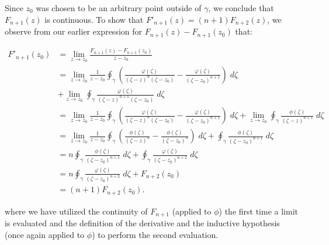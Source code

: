 \begin{solution}
    Since $z_0$ was chosen to be an arbitrary point outside of $\gamma$, we conclude that $F_{n+1}(z)$ is continuous. To
    show that $F'_{n+1}(z) = (n + 1) F_{n+2}(z)$, we observe from our earlier expression for $F_{n+1}(z) - F_{n+1}(z_0)$ 
    that:

    \begin{align*}
        F'_{n+1}(z_0) &= \lim_{z \to z_0} \frac{F_{n+1}(z) - F_{n+1}(z_0)}{z - z_0} \\
                    &= \lim_{z \to z_0} \frac{1}{z - z_0}\oint_{\gamma} {\left(\frac{\varphi(\zeta)}{(\zeta - z)^{n}(\zeta - z_0)} - \frac{\varphi(\zeta)}{(\zeta - z_0)^{n+1}} \right) \; d\zeta} \\
                    &+ \lim_{z \to z_0} \oint_{\gamma} {\frac{\varphi(\zeta)}{(\zeta - z)^{n+1}(\zeta - z_0)} \; d\zeta} \\
                    &= \lim_{z \to z_0} \frac{1}{z - z_0}\oint_{\gamma} {\left(\frac{\varphi(\zeta)}{(\zeta - z)^{n}(\zeta - z_0)} - \frac{\varphi(\zeta)}{(\zeta - z_0)^{n+1}} \right) \; d\zeta}
                    + \lim_{z \to z_0} \oint_{\gamma} {\frac{\phi(\zeta)}{(\zeta - z)^{n+1}} \; d\zeta} \\
                    &= \lim_{z \to z_0} \frac{1}{z - z_0}\oint_{\gamma} {\left(\frac{\phi(\zeta)}{(\zeta - z)^{n}} - \frac{\phi(\zeta)}{(\zeta - z_0)^n} \right) \; d\zeta}
                    + \oint_{\gamma} {\frac{\phi(\zeta)}{(\zeta - z_0)^{n+1}} \; d\zeta} \\
                    &= n \oint_{\gamma} {\frac{\phi(\zeta)}{(\zeta - z_0)^{n+1}} \; d\zeta}
                    + \oint_{\gamma} {\frac{\varphi(\zeta)}{(\zeta - z_0)^{n+2}} \; d\zeta} \\
                    &= n \oint_{\gamma} {\frac{\varphi(\zeta)}{(\zeta - z_0)^{n+2}} \; d\zeta} + F_{n+2}(z_0) \\
                    &= (n + 1) F_{n+2}(z_0).
    \end{align*}

    where we have utilized the continuity of $F_{n+1}$ (applied to $\phi$) the first time a limit is evaluated and the 
    definition of the derivative and the inductive hypothesis (once again applied to $\phi$) to perform the second 
    evaluation.
    \ \\
\end{solution}
